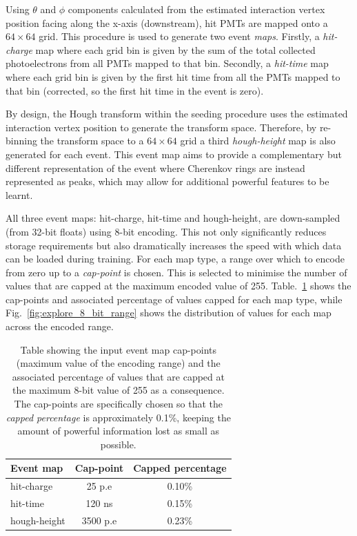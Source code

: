 Using $\theta$ and $\phi$ components calculated from the estimated interaction vertex position
facing along the x-axis (downstream), hit PMTs are mapped onto a $64 \times 64$ grid. This
procedure is used to generate two event \emph{maps}. Firstly, a \emph{hit-charge} map where each
grid bin is given by the sum of the total collected photoelectrons from all PMTs mapped to that
bin. Secondly, a \emph{hit-time} map where each grid bin is given by the first hit time from all
the PMTs mapped to that bin (corrected, so the first hit time in the event is zero).

By design, the Hough transform within the seeding procedure uses the estimated interaction vertex
position to generate the transform space. Therefore, by re-binning the transform space to a $64
    \times 64$ grid a third \emph{hough-height} map is also generated for each event. This event map
aims to provide a complementary but different representation of the event where Cherenkov rings
are instead represented as peaks, which may allow for additional powerful features to be learnt.

All three event maps: hit-charge, hit-time and hough-height, are down-sampled (from 32-bit floats)
using 8-bit encoding. This not only significantly reduces storage requirements but also
dramatically increases the speed with which data can be loaded during training. For each map type,
a range over which to encode from zero up to a \emph{cap-point} is chosen. This is selected to
minimise the number of values that are capped at the maximum encoded value of 255.
Table.~\ref{tab:encoding} shows the cap-points and associated percentage of values capped for each
map type, while Fig.~\ref{fig:explore_8_bit_range} shows the distribution of values for each map
across the encoded range.

\begin{table}
    \begin{tabular}{lcc}
        Event map    & Cap-point & Capped percentage \\
        \midrule
        hit-charge   & 25 p.e    & 0.10\%            \\
        hit-time     & 120 ns    & 0.15\%            \\
        hough-height & 3500 p.e  & 0.23\%            \\
    \end{tabular}
    \caption[Table of input event map 8-bit cap-points]
    {Table showing the input event map cap-points (maximum value of the encoding range) and the
        associated percentage of values that are capped at the maximum 8-bit value of 255 as a
        consequence. The cap-points are specifically chosen so that the \emph{capped percentage}
        is approximately 0.1\%, keeping the amount of powerful information lost as small as
        possible.}
    \label{tab:encoding}
\end{table}

